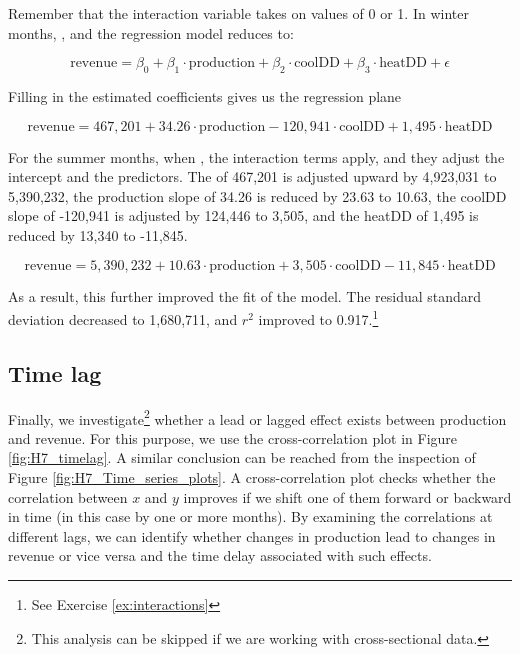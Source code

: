 Remember that the interaction variable  takes on values of 0 or 1. In winter months, , and the regression model reduces to:

\begin{equation*}
\text{revenue} = \beta_0 + \beta_1 \cdot \text{production} + \beta_2 \cdot \text{coolDD} + \beta_3 \cdot \text{heatDD} + \epsilon
\end{equation*}

Filling in the estimated coefficients gives us the regression plane

\begin{equation*}
\text{revenue} = 467,201 + 34.26 \cdot \text{production} -120,941 \cdot \text{coolDD} + 1,495 \cdot \text{heatDD}
\end{equation*}

For the summer months, when , the interaction terms apply, and they adjust the intercept and the predictors. The  of 467,201 is adjusted upward by 4,923,031 to 5,390,232, the production slope of 34.26 is reduced by 23.63 to 10.63, the coolDD slope of -120,941 is adjusted by 124,446 to 3,505, and the heatDD of 1,495 is reduced by 13,340 to -11,845.

\begin{equation*}
\text{revenue} = 5,390,232 + 10.63 \cdot \text{production} + 3,505 \cdot \text{coolDD} -11,845 \cdot \text{heatDD}
\end{equation*}

As a result, this further improved the fit of the model. The residual standard deviation decreased to 1,680,711, and $r^2$ improved to 0.917.\footnote{See Exercise \ref{ex:interactions}} 


\subsection{Time lag} %
\label{sub:time_lag}

Finally, we investigate\footnote{This analysis can be skipped if we are working with cross-sectional data.} whether a lead or lagged effect exists between production and revenue. 
For this purpose, we use the cross-correlation plot in Figure \ref{fig:H7_timelag}. 
A similar conclusion can be reached from the inspection of Figure \ref{fig:H7_Time_series_plots}.
A cross-correlation plot checks whether the correlation between $x$ and $y$ improves if we shift one of them forward or backward in time (in this case by one or more months). 
By examining the correlations at different lags, we can identify whether changes in production lead to changes in revenue or vice versa and the time delay associated with such effects.


